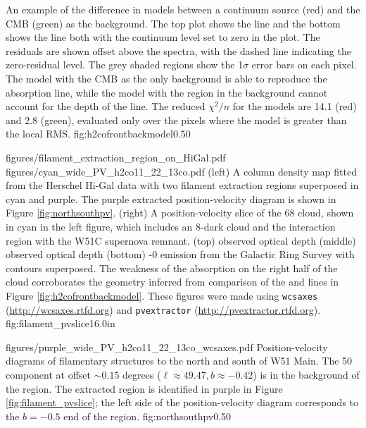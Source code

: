 {An example of the difference in models between a continuum source (red) and
the CMB (green) as the background.  The top plot shows the \oneone line and the
bottom shows the \twotwo line both with the continuum level set to zero in the
plot.  The residuals are shown
offset above the spectra, with the dashed line indicating the zero-residual
level.  The grey shaded regions show the 1$\sigma$ error bars on each pixel.
The model with the CMB as the only
background is able to reproduce the absorption line, while the model with the
\hii region in the background cannot account for the depth of the \twotwo line.
The reduced $\chi^2/n$ for the models are 14.1 (red) and 2.8 (green), evaluated
only over the pixels where the model is greater than the local RMS.}
{fig:h2cofrontbackmodel}{0.5}{0}

\FigureTwoAA
{figures/filament_extraction_region_on_HiGal.pdf}
{figures/cyan_wide_PV_h2co11_22_13co.pdf}
{(left) A column density map fitted from the Herschel Hi-Gal data with two
filament extraction regions superposed in cyan and purple.
The purple extracted position-velocity diagram is shown in Figure
\ref{fig:northsouthpv}.
(right) A position-velocity slice of the 68 \kms cloud, shown in cyan in the
left figure, which includes an 8\um-dark cloud and the interaction region
with the W51C supernova remnant.
(top) \formaldehyde \oneone observed optical depth
(middle) \formaldehyde \twotwo observed optical depth
(bottom) -0 emission from the Galactic Ring Survey
\citep[GRS][]{Jackson2006a} with \formaldehyde \oneone
contours superposed.  The weakness of the \formaldehyde absorption on the right
half of the cloud corroborates the geometry inferred from comparison of the \oneone
and \twotwo lines in Figure \ref{fig:h2cofrontbackmodel}.
These figures were made using \texttt{wcsaxes} (\protect\url{http://wcsaxes.rtfd.org})
and \texttt{pvextractor} (\protect\url{http://pvextractor.rtfd.org}).
}
{fig:filament_pvslice}{1}{6.0in}


\Figure
{figures/purple_wide_PV_h2co11_22_13co_wcsaxes.pdf}
{Position-velocity diagrams of filamentary structures to the north and south of
W51 Main.  The 50 \kms component at offset $\sim0.15$ degrees
($\ell\approx49.47, b\approx-0.42$) is in the background of the \hii region.
The extracted region is identified in purple in Figure
\ref{fig:filament_pvslice}; the left side of the position-velocity diagram
corresponds to the $b=-0.5$ end of the region.}
{fig:northsouthpv}{0.5}{0}

